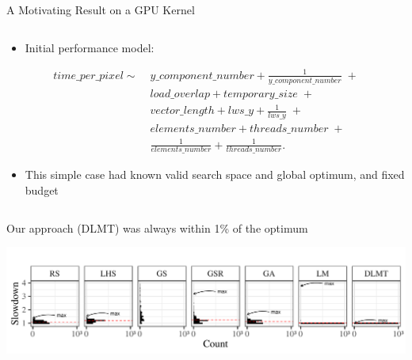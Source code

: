 \documentclass[11pt, compress, aspectratio=169, xcolor={table,usenames,dvipsnames}]{beamer}
\begin{document}
\begin{frame}
\begin{columns}
\begin{column}{0.86\columnwidth}
\begin{columns}
\begin{column}[t]{0.5\columnwidth}
\begin{block}{A Motivating Result on a GPU Kernel}
\begin{columns}
\begin{column}{0.49\columnwidth}
\begin{itemize}
\item Initial \alert{performance model}:
\end{itemize}
{\tiny
  \begin{align}
    time\_per\_pixel \sim & \; y\_component\_number + \frac{1}{y\_component\_number} \; + \nonumber \\
    & \; load\_overlap + temporary\_size \; + \nonumber \\
    & \; vector\_length + lws\_y + \frac{1}{lws\_y} \; + \nonumber \\
    & \; elements\_number + threads\_number  \; + \nonumber \\
    & \; \frac{1}{elements\_number} + \frac{1}{threads\_number}\text{.} \nonumber
  \end{align}
}

\begin{itemize}
\item This \alert{simple case} had known \alert{valid search space} and
\alert{global optimum}, and \alert{fixed budget}
\end{itemize}
\end{column}
\end{columns}
\vspace{1em}
\begin{center}
{\small
Our approach (\alert{DLMT}) was always \alert{within 1\% of the optimum}
}
\end{center}
\begin{center}
\includegraphics[width=0.9\columnwidth]{../../../img/comparison_histogram.pdf}
\end{center}


\end{block}
\end{column}
\end{columns}
\end{column}
\end{columns}
\end{frame}
\end{document}
